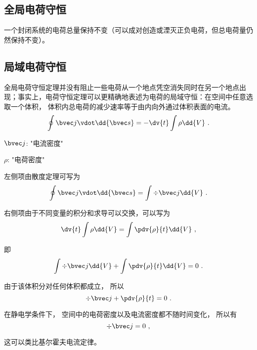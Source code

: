 
\subsection{全局电荷守恒}
一个封闭系统的电荷总量保持不变\cite{GriffE}（可以成对创造或湮灭正负电荷，但总电荷量仍然保持不变）。

\subsection{局域电荷守恒}
全局电荷守恒定理并没有阻止一些电荷从一个地点凭空消失同时在另一个地点出现；事实上，电荷守恒定理可以更精确地表述为电荷的局域守恒：在空间中任意选取一个体积， 体积内总电荷的减少速率等于由内向外通过体积表面的电流。\cite{GriffE}
\begin{equation}
\oint \bvec j \vdot \dd{\bvec s}  =  - \dv{t} \int \rho \dd{V}~.
\end{equation} 

$\bvec j$: "电流密度"

$\rho$: "电荷密度"

左侧项由散度定理可写为
\begin{equation}
\oint \bvec j \vdot \dd{\bvec s}  =\int \div \bvec j \dd{V}~.
\end{equation} 

右侧项由于不同变量的积分和求导可以交换，可以写为%
\begin{equation}
\dv{t} \int \rho  \dd{V}  = \int \pdv{\rho}{t} \dd{V}~,
\end{equation}

即
\begin{equation}
\int \div \bvec j \dd{V} + \int \pdv{\rho}{t} \dd{V} = 0~.
\end{equation} 

由于该体积分对任何体积都成立， 所以
\begin{equation}\label{ChgCsv_eq4}
\div \bvec j + \pdv{\rho}{t} = 0~.
\end{equation}

在静电学条件下， 空间中的电荷密度以及电流密度都不随时间变化， 所以有
\begin{equation}
\div \bvec j = 0~,
\end{equation}

这可以类比基尔霍夫电流定律。
